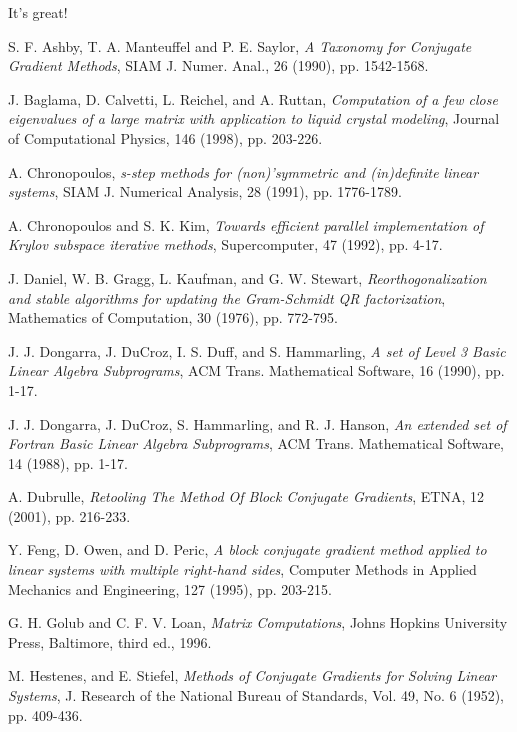 \documentclass[twoside]{siamltex}
\begin{document}
It's great!

\begin{thebibliography}{AAAA99}

 S. F. Ashby, T. A. Manteuffel and P. E.
Saylor, {\em A Taxonomy for Conjugate Gradient Methods}, SIAM J.
Numer. Anal., 26 (1990), pp. 1542-1568.

 J. Baglama, D. Calvetti, L. Reichel, and A.
Ruttan, {\em Computation of a few close eigenvalues of a large
matrix with application to liquid crystal modeling}, Journal of
Computational Physics, 146 (1998), pp. 203-226.

 A. Chronopoulos, {\em s-step methods for
(non)'symmetric and (in)definite linear systems}, SIAM J.
Numerical Analysis, 28 (1991), pp. 1776-1789.

 A. Chronopoulos and S. K. Kim, {\em Towards
efficient parallel implementation of Krylov subspace iterative
methods}, Supercomputer, 47 (1992), pp. 4-17.

 J. Daniel, W. B. Gragg, L. Kaufman, and G. W.
Stewart, {\em Reorthogonalization and stable algorithms for
updating the Gram-Schmidt QR factorization}, Mathematics of
Computation, 30 (1976), pp. 772-795.

 J. J. Dongarra, J. DuCroz, I. S. Duff, and S.
Hammarling, {\em A set of Level 3 Basic Linear Algebra
Subprograms}, ACM Trans. Mathematical Software, 16 (1990), pp.
1-17.

 J. J. Dongarra, J. DuCroz, S. Hammarling, and
R. J. Hanson, {\em An extended set of Fortran Basic Linear Algebra
Subprograms}, ACM Trans. Mathematical Software, 14 (1988), pp.
1-17.

 A. Dubrulle, {\em Retooling The Method Of
Block Conjugate Gradients}, ETNA, 12 (2001), pp. 216-233.

 Y. Feng, D. Owen, and D. Peric, {\em A
block conjugate gradient method applied to linear systems with
multiple right-hand sides}, Computer Methods in Applied Mechanics
and Engineering, 127 (1995), pp. 203-215.

 G. H. Golub and C. F. V. Loan, {\em Matrix
Computations}, Johns Hopkins University Press, Baltimore, third
ed., 1996.

 M. Hestenes, and E. Stiefel, {\em Methods of
Conjugate Gradients for Solving Linear Systems}, J. Research of
the National Bureau of Standards, Vol. 49, No. 6 (1952), pp.
409-436.


\end{thebibliography}
\end{document}
